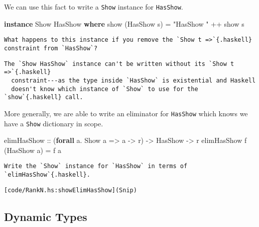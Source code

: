 \documentclass[
  11pt,
]{book}
\newenvironment{Shaded}{}{}
\newcommand{\DataTypeTok}[1]{\textcolor[rgb]{0.56,0.13,0.00}{#1}}
\newcommand{\FunctionTok}[1]{\textcolor[rgb]{0.02,0.16,0.49}{#1}}
\newcommand{\KeywordTok}[1]{\textcolor[rgb]{0.00,0.44,0.13}{\textbf{#1}}}
\newcommand{\NormalTok}[1]{#1}
\newcommand{\OperatorTok}[1]{\textcolor[rgb]{0.40,0.40,0.40}{#1}}
\newcommand{\OtherTok}[1]{\textcolor[rgb]{0.00,0.44,0.13}{#1}}
\newcommand{\StringTok}[1]{\textcolor[rgb]{0.25,0.44,0.63}{#1}}
\theoremstyle{nonumberplain}
\begin{document}
We can use this fact to write a \texttt{Show} instance for
\texttt{HasShow}.

\begin{Shaded}
\begin{Highlighting}[]
\KeywordTok{instance} \DataTypeTok{Show} \DataTypeTok{HasShow} \KeywordTok{where}
  \FunctionTok{show}\NormalTok{ (}\DataTypeTok{HasShow}\NormalTok{ s) }\OtherTok{=} \StringTok{"HasShow "} \OperatorTok{++} \FunctionTok{show}\NormalTok{ s}
\end{Highlighting}
\end{Shaded}

\begin{verbatim}
What happens to this instance if you remove the `Show t =>`{.haskell}
constraint from `HasShow`?
\end{verbatim}

\begin{verbatim}
The `Show HasShow` instance can't be written without its `Show t =>`{.haskell}
  constraint---as the type inside `HasShow` is existential and Haskell
  doesn't know which instance of `Show` to use for the `show`{.haskell} call.
\end{verbatim}

More generally, we are able to write an eliminator for \texttt{HasShow}
which knows we have a \texttt{Show} dictionary in scope.

\begin{Shaded}
\begin{Highlighting}[]
\NormalTok{elimHasShow}
\OtherTok{    ::}\NormalTok{ (}\KeywordTok{forall}\NormalTok{ a}\OperatorTok{.} \DataTypeTok{Show}\NormalTok{ a }\OtherTok{=\textgreater{}}\NormalTok{ a }\OtherTok{{-}\textgreater{}}\NormalTok{ r)}
    \OtherTok{{-}\textgreater{}} \DataTypeTok{HasShow}
    \OtherTok{{-}\textgreater{}}\NormalTok{ r}
\NormalTok{elimHasShow f (}\DataTypeTok{HasShow}\NormalTok{ a) }\OtherTok{=}\NormalTok{ f a}
\end{Highlighting}
\end{Shaded}

\begin{verbatim}
Write the `Show` instance for `HasShow` in terms of
`elimHasShow`{.haskell}.
\end{verbatim}

\begin{verbatim}
[code/RankN.hs:showElimHasShow](Snip)
\end{verbatim}

\hypertarget{dynamic-types}{%
\subsection{Dynamic Types}\label{dynamic-types}}
\end{document}
